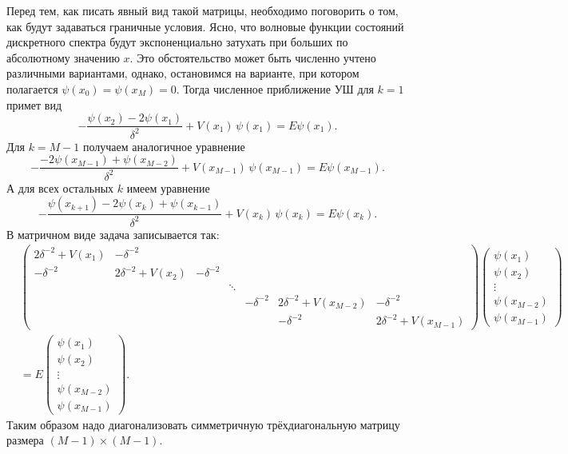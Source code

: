 \documentclass[10pt]{article}
\begin{document}
Перед тем, как писать явный вид такой матрицы, необходимо поговорить о том, как будут задаваться граничные условия. Ясно, что волновые функции состояний дискретного спектра будут экспоненциально затухать при больших по абсолютному значению $x$. Это обстоятельство может быть численно учтено различными вариантами, однако, остановимся на варианте, при котором полагается $\psi(x_0) = \psi(x_M) = 0$. Тогда численное приближение УШ для $k=1$ примет вид
\begin{equation}
    -\dfrac{\psi(x_{2}) - 2\psi(x_{1})}{\delta^2} + V(x_1)\,\psi(x_1) = E\psi(x_1).
\end{equation}
Для $k=M-1$ получаем аналогичное уравнение
\begin{equation}
    -\dfrac{-2\psi(x_{M-1})+\psi(x_{M-2}) }{\delta^2} + V(x_{M-1})\,\psi(x_{M-1}) = E\psi(x_{M-1}).
\end{equation}
А для всех остальных $k$ имеем уравнение
\begin{equation}
    -\dfrac{\psi(x_{k+1}) - 2\psi(x_{k}) + \psi(x_{k-1})}{\delta^2} + V(x_k)\,\psi(x_k) = E\psi(x_k).
\end{equation}
В матричном виде задача записывается так:
\begin{equation}
\begin{split}
    &\begin{pmatrix} 
        2\delta^{-2}+V(x_1)& -\delta^{-2}\\
        -\delta^{-2}& 2\delta^{-2}+V(x_2)& -\delta^{-2}\\
        & & & \ddots&\\
        & & & & -\delta^{-2}& 2\delta^{-2}+V(x_{M-2})& -\delta^{-2}\\
        & & & & & -\delta^{-2}& 2\delta^{-2}+V(x_{M-1})
    \end{pmatrix}
    \begin{pmatrix}
        \psi(x_1)\\
        \psi(x_2)\\
        \vdots\\
        \psi(x_{M-2})\\
        \psi(x_{M-1})
    \end{pmatrix}\\
    &=E
    \begin{pmatrix}
        \psi(x_1)\\
        \psi(x_2)\\
        \vdots\\
        \psi(x_{M-2})\\
        \psi(x_{M-1})
    \end{pmatrix}.
\end{split}
\end{equation}
Таким образом надо диагонализовать симметричную трёхдиагональную матрицу размера $(M-1)\times(M-1)$.
\end{document}
